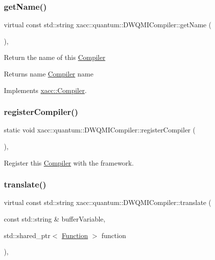 \subsubsection{\texorpdfstring{get\+Name()}{getName()}}
{\footnotesize\ttfamily virtual const std\+::string xacc\+::quantum\+::\+D\+W\+Q\+M\+I\+Compiler\+::get\+Name (\begin{DoxyParamCaption}{ }\end{DoxyParamCaption})\hspace{0.3cm}{\ttfamily [inline]}, {\ttfamily [virtual]}}

Return the name of this \hyperlink{a01127}{Compiler} \begin{DoxyReturn}{Returns}
name \hyperlink{a01127}{Compiler} name 
\end{DoxyReturn}


Implements \hyperlink{a01127_a87fca9100e6462122f5b687c3a0fb3fb}{xacc\+::\+Compiler}.

\mbox{\label{a00923_a421daa5286f31e2b5ab4c141a34c94cd}} 
\subsubsection{\texorpdfstring{register\+Compiler()}{registerCompiler()}}
{\footnotesize\ttfamily static void xacc\+::quantum\+::\+D\+W\+Q\+M\+I\+Compiler\+::register\+Compiler (\begin{DoxyParamCaption}{ }\end{DoxyParamCaption})\hspace{0.3cm}{\ttfamily [inline]}, {\ttfamily [static]}}

Register this \hyperlink{a01127}{Compiler} with the framework. \mbox{\label{a00923_a56a345539665099329209b3b5f6810c9}} 
\subsubsection{\texorpdfstring{translate()}{translate()}}
{\footnotesize\ttfamily virtual const std\+::string xacc\+::quantum\+::\+D\+W\+Q\+M\+I\+Compiler\+::translate (\begin{DoxyParamCaption}\item[{const std\+::string \&}]{buffer\+Variable,  }\item[{std\+::shared\+\_\+ptr$<$ \hyperlink{a01151}{Function} $>$}]{function }\end{DoxyParamCaption})\hspace{0.3cm}{\ttfamily [inline]}, {\ttfamily [virtual]}}

